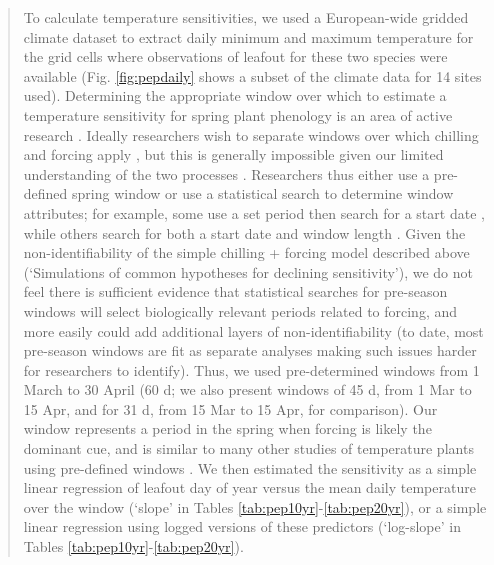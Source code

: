 \documentclass[11pt,letter]{article}
\begin{document}
\begin{quote}
To calculate temperature sensitivities, we used a European-wide gridded climate dataset \emph{\citep[{\normalfont E-OBS},][]{cornes2018}} to extract daily minimum and maximum temperature for the grid cells where observations of leafout for these two species were available (Fig. \ref{fig:pepdaily} shows a subset of the climate data for 14 sites used). Determining the appropriate window over which to estimate a temperature sensitivity for spring plant phenology is an area of active research \citep{gusewell2017,xupreseason2018}. Ideally researchers wish to separate windows over which chilling and forcing apply \citep[if they can be cleanly separated,][]{linkosala2008,lundell2020}, but this is generally impossible given our limited understanding of the two processes \citep{chuine2016}. Researchers thus either use a pre-defined spring window \citep[e.g.,][]{zhnag2015,park2018remsens,Park2019,kopp2020} or use a statistical search to determine window attributes; for example, some use a set period then search for a start date \citep[e.g.,][]{Cook:2012pnas,wang2015ecoind}, while others search for both a start date and window length \citep[e.g.,][]{fu2015,tansey2017}. Given the non-identifiability of the simple chilling + forcing model described above (`Simulations of common hypotheses for declining sensitivity'), we do not feel there is sufficient evidence that statistical searches for pre-season windows will select biologically relevant periods related to forcing, and more easily could add additional layers of non-identifiability (to date, most pre-season windows are fit as separate analyses making such issues harder for researchers to identify). Thus, we used pre-determined windows from 1 March to 30 April (60 d; we also present windows of 45 d, from 1 Mar to 15 Apr, and for 31 d, from 15 Mar to 15 Apr, for comparison). Our window represents a period in the spring when forcing is likely the dominant cue, and is similar to many other studies of temperature plants using pre-defined windows \citep[e.g.,][]{prevey2017,Park2019}. We then estimated the sensitivity as a simple linear regression of leafout day of year versus the mean daily temperature over the window (`slope' in Tables \ref{tab:pep10yr}-\ref{tab:pep20yr}), or a simple linear regression using logged versions of these predictors (`log-slope' in Tables \ref{tab:pep10yr}-\ref{tab:pep20yr}). \
\end{quote}
\end{document}

